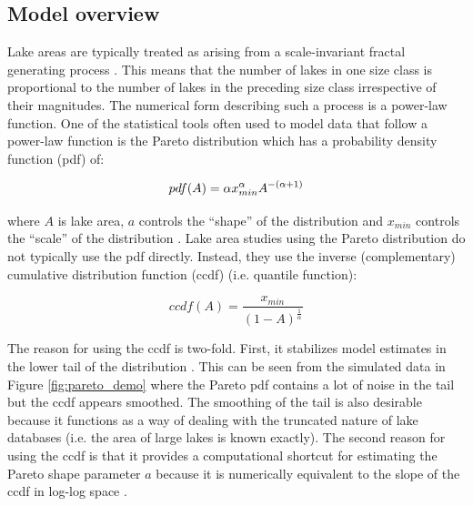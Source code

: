 \documentclass{article}
\begin{document}
\subsection{Model overview}



Lake areas are typically treated as arising from a scale-invariant fractal generating process \citep{winslowDoesLakeSize2015, downingGlobalAbundanceSize2006, mcdonald_regional_2012, goodchildLakesFractalSurfaces1988, hamiltonEstimationFractalDimension1992}. This means that the number of lakes in one size class is proportional to the number of lakes in the preceding size class irrespective of their magnitudes. The numerical form describing such a process is a power-law function. One of the statistical tools often used to model data that follow a power-law function is the Pareto distribution which has a probability density function (pdf) of:

\begin{equation}
	pdf(A) = \alpha x_{min}^{\alpha}A^{-(\alpha+1)} \\
	\label{eqn:pareto_pdf}
\end{equation}

where $A$ is lake area, $a$ controls the “shape” of the distribution and $x_{min}$ controls the “scale” of the distribution \citep{shaliziAdvancedDataAnalysis2017}. Lake area studies using the Pareto distribution do not typically use the pdf directly. Instead, they use the inverse (complementary) cumulative distribution function (ccdf) (i.e. quantile function):

\begin{equation}
	ccdf(A) = \frac{x_{min}}{(1-A)^{\frac{1}{\alpha}}}
	\label{eqn:pareto_ccdf}
\end{equation}

The reason for using the ccdf is two-fold. First, it stabilizes model estimates in the lower tail of the distribution \citep{newman_power_2005}. This can be seen from the simulated data in Figure \ref{fig:pareto_demo} where the Pareto pdf contains a lot of noise in the tail but the ccdf appears smoothed. The smoothing of the tail is also desirable because it functions as a way of dealing with the truncated nature of lake databases (i.e. the area of large lakes is known exactly). The second reason for using the ccdf is that it provides a computational shortcut for estimating the Pareto shape parameter $a$ because it is numerically equivalent to the slope of the ccdf in log-log space \citep{downingGlobalAbundanceSize2006}.
\end{document}
